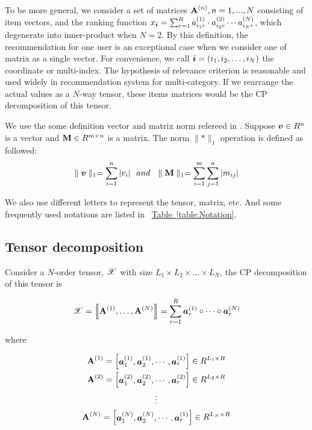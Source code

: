 \documentclass[letterpaper]{article}
\newcommand{\Sca}[3]{{#1}^{(#2)}_{i_#2#3}}%
\newcommand{\T}[1]{\boldsymbol{\mathscr{\MakeUppercase{#1}}}}
\newcommand{\KT}[1]{\left\llbracket #1 \right\rrbracket}
\newcommand{\V}[1]{{\bm{{\MakeLowercase{#1}}}}}
\newcommand{\VnC}[3]{\V{#1}^{(#2)}_{#3}}
\newcommand{\M}[1]{{\bm{\mathbf{\MakeUppercase{#1}}}}}
\newcommand{\Mn}[2]{\M{#1}^{(#2)}}
\newcommand{\norm}[2]{\parallel#1\parallel_{#2}}
\newcommand{\Table}[1] {\hyperref[table:#1] {Table~\ref*{table:#1}}} %
\begin{document}
To be more general, we consider a set of matrices $\M{A}^{(n)},n = 1,...,N$ consisting of item vectors, and the ranking function $x_\V{i} = \sum_{r=1}^{R}\Sca{a}{1}{r}\cdot\Sca{a}{2}{r}\cdots\Sca{a}{N}{r}$, which degenerate into inner-product when $N=2$. By this definition, the recommendation for one user is an exceptional case when we consider one of matrix as a single vector. For convenience, we call $\V{i} = (i_1,i_2,\ldots,i_N)$ the coordinate or multi-index. The hypothesis of relevance criterion is reasonable and used widely in recommendation system for multi-category. If we rearrange the actual values as a $N$-way tensor, these items matrices would be the CP decomposition of this tensor.


We use the some definition vector and matrix norm refereed in \cite{BaPiKoSe15}. Suppose $\V{v}\in R^n$ is a vector and $\M{M}\in R^{m\times n}$ is a matrix. The norm $\norm{*}{1}$ operation is defined as followed:
\[
    \norm{\V{v}}{1} = \sum_{i=1}^{n}|v_i|
    \ \  and \ \
    \norm{\M{M}}{1} = \sum_{i=1}^{m}\sum_{j=1}^{n}|m_{ij}|
\]

We also use different letters to represent the tensor, matrix, etc. And some frequently used notations are listed in ~\Table{Notation}.

\subsection{Tensor decomposition}

Consider a $N$-order tensor, $\T{X}$ with size $L_1\times L_2\times\ldots\times L_N$, the CP decomposition\cite{KoBa09} of this tensor is

\begin{equation}\label{eq:CPDecomposition}
\T{X}= \KT{ \Mn{A}{1},\dots,\Mn{A}{N}} =
\sum_{r=1}^{R}\VnC{A}{1}{r} \circ \cdots \circ \VnC{A}{N}{r}
\end{equation}

where

\begin{gather*}\label{eq:ColumnVectorsForm}
\M{A}^{(1)} =
\begin{bmatrix}\VnC{a}{1}{1},\VnC{a}{1}{2},\cdots,\VnC{a}{1}{r}\end{bmatrix}\in R^{L_1\times R}\\
\M{A}^{(2)} =
\begin{bmatrix}\VnC{a}{2}{1},\VnC{a}{2}{2},\cdots,\VnC{a}{2}{r}\end{bmatrix}\in R^{L_2\times R}\\
\vdots\\
\M{A}^{(N)} =
\begin{bmatrix}\VnC{a}{N}{1},\VnC{a}{N}{2},\cdots,\VnC{a}{1}{r}\end{bmatrix}\in R^{L_N\times R}\\
\end{gather*}
\end{document}
